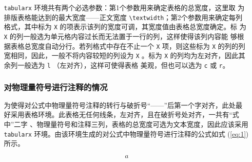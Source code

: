 \texttt{tabularx} 环境共有两个必选参数：第1个参数用来确定表格的总宽度，这里取
为排版表格能达到的最大宽度——正文宽度 \verb|\textwidth|；第2个参数用来确定每列
格式，其中标为 \verb|X| 的项表示该列的宽度可调，其宽度值由表格总宽度确定。标
为 \verb|X| 的列一般选为单元格内容过长而无法置于一行的列，这样使得该列内容能
够根据表格总宽度自动分行。若列格式中存在不止一个 \verb|X| 项，则这些标为
\verb|X| 的列的列宽相同，因此，一般不将内容较短的列设为 \verb|X| 。标为
\verb|X| 的列均为左对齐，因此其余列一般选为 \verb|l| （左对齐），这样可使得表格
美观，但也可以选为 \verb|c| 或 \verb|r|。

\subsubsection{对物理量符号进行注释的情况}

为使得对公式中物理量符号注释的转行与破折号“——”后第一个字对齐，此处最
好采用表格环境。此表格无任何线条，左对齐，且在破折号处对齐，一共有“式中”二字
、物理量符号和注释三列，表格的总宽度可选为文本宽度，因此应该采用
\texttt{tabularx} 环境。由该环境生成的对公式中物理量符号进行注释的公式如式
(\ref{eq:1})所示。

\begin{equation}
\label{eq:1}
a
\end{equation}

